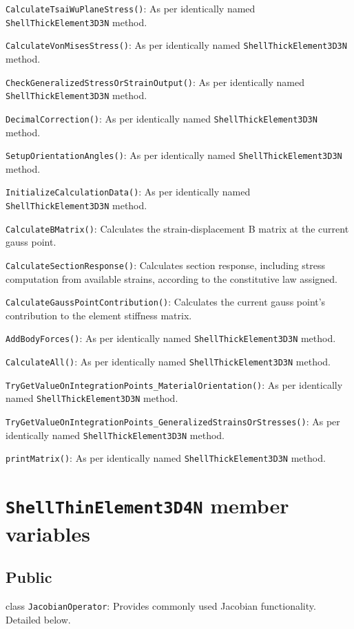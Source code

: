 \texttt{CalculateTsaiWuPlaneStress()}: As per identically named \texttt{ShellThickElement3D3N} method.

\texttt{CalculateVonMisesStress()}: As per identically named \texttt{ShellThickElement3D3N} method.

\texttt{CheckGeneralizedStressOrStrainOutput()}: As per identically named \texttt{ShellThickElement3D3N} method.

\texttt{DecimalCorrection()}: As per identically named \texttt{ShellThickElement3D3N} method.

\texttt{SetupOrientationAngles()}: As per identically named \texttt{ShellThickElement3D3N} method.

\texttt{InitializeCalculationData()}: As per identically named \texttt{ShellThickElement3D3N} method.

\texttt{CalculateBMatrix()}: Calculates the strain-displacement B matrix at the current gauss point.

\texttt{CalculateSectionResponse()}: Calculates section response, including stress computation from available strains, according to the constitutive law assigned.

\texttt{CalculateGaussPointContribution()}: Calculates the current gauss point's contribution to the element stiffness matrix.

\texttt{AddBodyForces()}: As per identically named \texttt{ShellThickElement3D3N} method.

\texttt{CalculateAll()}: As per identically named \texttt{ShellThickElement3D3N} method.

\texttt{TryGetValueOnIntegrationPoints\_MaterialOrientation()}: As per identically named \texttt{ShellThickElement3D3N} method.

\texttt{TryGetValueOnIntegrationPoints\_GeneralizedStrainsOrStresses()}: As per identically named \texttt{ShellThickElement3D3N} method.

\texttt{printMatrix()}: As per identically named \texttt{ShellThickElement3D3N} method.

\section{\texttt{ShellThinElement3D4N} member variables}
\subsection{Public}
class \texttt{JacobianOperator}: Provides commonly used Jacobian functionality. Detailed below.

